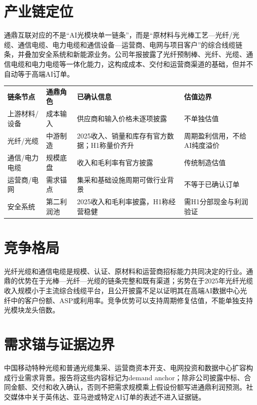 \section{产业链定位}
通鼎互联对应的不是“AI光模块单一链条”，而是“原材料与光棒工艺—光纤/光缆、通信电缆、电力电缆和通信设备—运营商、电网与项目客户”的综合线缆链条，并叠加安全系统和新能源业务。公司年报披露了光纤预制棒、光纤、光缆、通信电缆和电力电缆等一体化能力，这构成成本、交付和运营商渠道的基础，但并不自动等于高端AI订单。

\begin{exhibitbox}
\begin{tabularx}{\exhibitboxwidth}{L{2.6cm}L{2.7cm}X L{2.5cm}}
\textbf{链条节点} & \textbf{通鼎角色} & \textbf{已确认信息} & \textbf{估值边界} \\
上游材料/设备 & 成本输入 & 供应商和输入价格未逐项披露 & 不单独估值 \\
光纤/光缆 & 中游制造 & 2025收入、销量和库存有官方数据；H1称量价齐升 & 周期盈利信用，不给AI纯度溢价 \\
通信/电力电缆 & 规模底盘 & 收入和毛利率有官方披露 & 传统制造估值 \\
运营商/电网 & 需求锚点 & 集采和基础设施周期可做行业背景 & 不等于已确认订单 \\
安全系统 & 第二利润池 & 2025收入和毛利率披露，H1称经营稳健 & 需H1分部现金与利润验证 \\
\end{tabularx}
\end{exhibitbox}

\section{竞争格局}
光纤光缆和通信电缆是规模、认证、原材料和运营商招标能力共同决定的行业。通鼎的优势在于光棒—光纤—光缆的链条完整和既有渠道；劣势在于2025年光纤光缆收入规模小于主流综合线缆平台，且公开披露不足以证明其在高端AI数据中心光纤中的客户份额、ASP或利用率。竞争优势可以支持周期修复估值，不能单独支持光模块龙头倍数。

\section{需求锚与证据边界}
中国移动特种光缆和普通光缆集采、运营商资本开支、电网投资和数据中心扩容构成行业需求背景。报告将这些内容标记为demand anchor；除非公司披露中标、合同金额、交付和收入确认，否则不把需求规模乘上假设份额写进通鼎利润预测。社交媒体中关于英伟达、亚马逊或特定AI订单的表述不进入证据链。
